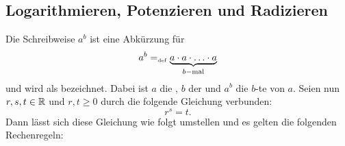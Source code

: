 \subsection{Logarithmieren, Potenzieren und Radizieren}
Die Schreibweise $a^b$ ist eine Abkürzung für 
\begin{displaymath}
a^b =_{\mathrm{\scriptscriptstyle def}} \underbrace{a \cdot a
\cdot \ldots \cdot a}_{b-\text{mal}} 
\end{displaymath}
und wird als  bezeichnet. Dabei ist $a$ die , $b$ der  und $a^b$ die $b$-te  von $a$. Seien nun  $r,s,t \in \mathbb R$ und $r,t \ge 0$ durch die folgende Gleichung verbunden:
\begin{displaymath}
r^s = t.
\end{displaymath}
Dann lässt sich diese Gleichung wie folgt umstellen und es gelten die
folgenden Rechenregeln:

